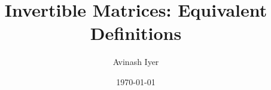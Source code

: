 \documentclass{beamer}
\title{Invertible Matrices: Equivalent Definitions}
\author{Avinash Iyer}
\institute{Occidental College}
\date{\today} %
\begin{document}
\begin{frame}
    \titlepage
\end{frame}
\end{document}
